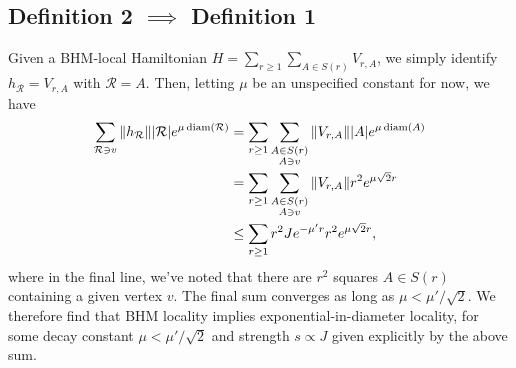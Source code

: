 \subsection{Definition 2 \texorpdfstring{$\implies$}{implies} Definition 1}
Given a BHM-local Hamiltonian $H = \sum_{r \geq 1} \sum_{A \in S(r)} V_{r,A}$, we simply identify $h_{\mathcal{R}} = V_{r, A}$ with $\mathcal{R} = A$. Then, letting $\mu$ be an unspecified constant for now, we have
\begin{subequations}
\begin{align}
    \sum_{\mathcal{R} \ni v} \norm{h_{\mathcal{R}}} \abs{\mathcal{R}} e^{\mu \operatorname{diam}(\mathcal{R})} &= \sum_{r\geq 1} \sum_{\substack{A \in S(r) \\ A \ni v}} \norm{V_{r,A}} \abs{A} e^{\mu \operatorname{diam}(A)} \\
    &= \sum_{r\geq 1} \sum_{\substack{A \in S(r) \\ A \ni v}} \norm{V_{r,A}} r^2 e^{\mu\sqrt{2} r} \\
    &\leq \sum_{r\geq 1} r^2 J e^{-\mu' r} r^2 e^{\mu\sqrt{2} r} ,
\end{align}
\end{subequations}
where in the final line, we've noted that there are $r^2$ squares $A \in S(r)$ containing a given vertex $v$. The final sum converges as long as $\mu < \mu' / \sqrt{2}$. We therefore find that BHM locality implies exponential-in-diameter locality, for some decay constant $\mu < \mu' / \sqrt{2}$ and strength $s \propto J$ given explicitly by the above sum.



